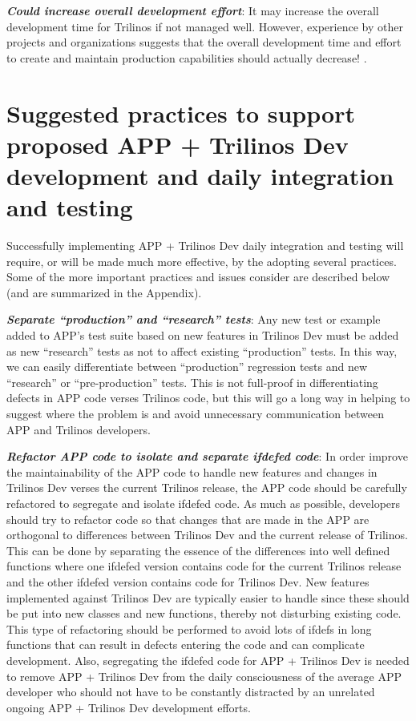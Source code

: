 \documentclass[pdf,ps2pdf,11pt]{SANDreport}
\begin{document}
{}\textit{\textbf{Could increase overall development effort}}: It may increase the
overall development time for Trilinos if not managed well.  However,
experience by other projects and organizations suggests that the overall
development time and effort to create and maintain production capabilities
should actually decrease! {}\cite{book:code-complete-2}.


%
{}\section{Suggested practices to support proposed APP + Trilinos Dev
development and daily integration and testing}
\label{sec:suggested-practices}
%

Successfully implementing APP + Trilinos Dev daily integration and testing will
require, or will be made much more effective, by the adopting several
practices.  Some of the more important practices and issues consider are
described below (and are summarized in the Appendix).

{}\textit{\textbf{Separate ``production'' and ``research'' tests}}: Any new
test or example added to APP's test suite based on new features in Trilinos
Dev must be added as new ``research'' tests as not to affect existing
``production'' tests.  In this way, we can easily differentiate between
``production'' regression tests and new ``research'' or ``pre-production''
tests.  This is not full-proof in differentiating defects in APP code verses
Trilinos code, but this will go a long way in helping to suggest where the
problem is and avoid unnecessary communication between APP and Trilinos
developers.

{}\textit{\textbf{Refactor APP code to isolate and separate ifdefed code}}: In
order improve the maintainability of the APP code to handle new features and
changes in Trilinos Dev verses the current Trilinos release, the APP code
should be carefully refactored to segregate and isolate ifdefed code.  As much
as possible, developers should try to refactor code so that changes that are
made in the APP are orthogonal to differences between Trilinos Dev and the
current release of Trilinos.  This can be done by separating the essence of
the differences into well defined functions where one ifdefed version contains
code for the current Trilinos release and the other ifdefed version contains
code for Trilinos Dev.  New features implemented against Trilinos Dev are
typically easier to handle since these should be put into new classes and new
functions, thereby not disturbing existing code.  This type of refactoring
should be performed to avoid lots of ifdefs in long functions that can result
in defects entering the code and can complicate development.  Also,
segregating the ifdefed code for APP + Trilinos Dev is needed to remove APP +
Trilinos Dev from the daily consciousness of the average APP developer who
should not have to be constantly distracted by an unrelated ongoing APP +
Trilinos Dev development efforts.
\end{document}
